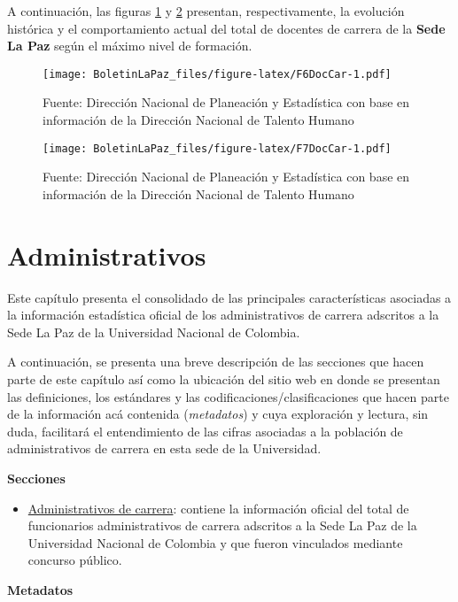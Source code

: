 \documentclass[
]{book}
\providecommand{\tightlist}{%
  \setlength{\itemsep}{0pt}\setlength{\parskip}{0pt}}
\begin{document}
A continuación, las figuras \ref{fig:F6DocCar} y \ref{fig:F7DocCar} presentan, respectivamente, la evolución histórica y el comportamiento actual del total de docentes de carrera de la \textbf{Sede La Paz} según el máximo nivel de formación.

\begin{figure}
\centering
\texttt{[image: BoletinLaPaz\_files/figure-latex/F6DocCar-1.pdf]}
\caption{\label{fig:F6DocCar}Fuente: Dirección Nacional de Planeación y Estadística con base en información de la Dirección Nacional de Talento Humano}
\end{figure}

\begin{figure}
\centering
\texttt{[image: BoletinLaPaz\_files/figure-latex/F7DocCar-1.pdf]}
\caption{\label{fig:F7DocCar}Fuente: Dirección Nacional de Planeación y Estadística con base en información de la Dirección Nacional de Talento Humano}
\end{figure}

\hypertarget{Admi}{%
\chapter{Administrativos}\label{Admi}}

Este capítulo presenta el consolidado de las principales características asociadas a la información estadística oficial de los administrativos de carrera adscritos a la Sede La Paz de la Universidad Nacional de Colombia.

A continuación, se presenta una breve descripción de las secciones que hacen parte de este capítulo así como la ubicación del sitio web en donde se presentan las definiciones, los estándares y las codificaciones/clasificaciones que hacen parte de la información acá contenida (\emph{metadatos}) y cuya exploración y lectura, sin duda, facilitará el entendimiento de las cifras asociadas a la población de administrativos de carrera en esta sede de la Universidad.

\textbf{Secciones}

\begin{itemize}
\tightlist
\item
  \protect\hyperlink{AdmCar}{Administrativos de carrera}: contiene la información oficial del total de funcionarios administrativos de carrera adscritos a la Sede La Paz de la Universidad Nacional de Colombia y que fueron vinculados mediante concurso público.
\end{itemize}

\textbf{Metadatos}
\end{document}
